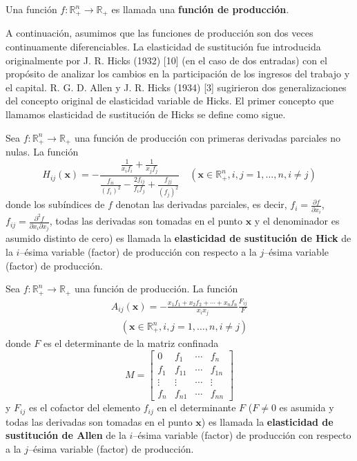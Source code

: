 \documentclass[a4paper,fleqn]{cas-dc}
\begin{document}
\begin{definition}
Una función $f\colon\mathds{R}^{n}_{+}\rightarrow\mathds{R}_{+}$ es llamada una \textbf{función de producción}.
\end{definition}
A continuación, asumimos que las funciones de producción son dos veces continuamente diferenciables. La elasticidad de sustitución fue introducida originalmente por J. R. Hicks (1932) [10] (en el caso de dos entradas) con el propósito de analizar los cambios en la participación de los ingresos del trabajo y el capital. R. G. D. Allen y J. R. Hicks (1934) [3] sugirieron dos generalizaciones del concepto original de elasticidad variable de Hicks. El primer concepto que llamamos elasticidad de sustitución de Hicks se define como sigue.
\begin{definition}
Sea $f\colon\mathds{R}^{n}_{+}\rightarrow\mathds{R}_{+}$ una función de producción con primeras derivadas parciales no nulas. La función
\begin{equation}
H_{ij}\left(\bm{x}\right)=-\frac{\frac{1}{x_{i}f_{i}}+\frac{1}{x_{j}f_{j}}}{\frac{f_{ii}}{{\left(f_{i}\right)}^{2}}-\frac{2f_{ij}}{f_{i}f_{j}}+\frac{f_{jj}}{{\left(f_{j}\right)}^{2}}}\quad\left(\bm{x}\in\mathds{R}^{n}_{+},i,j=1,\ldots,n,i\neq j\right)
\end{equation}
donde los subíndices de $f$ denotan las derivadas parciales, es decir, $f_{i}=\frac{\partial f}{\partial x_{i}}$, $f_{ij}=\frac{\partial^{2}f}{\partial x_{i}\partial x_{j}}$, todas las derivadas son tomadas en el punto $\bm{x}$ y el denominador es asumido distinto de cero) es llamada la \textbf{elasticidad de sustitución de Hick} de la $i$--ésima variable (factor) de producción con respecto a la $j$--ésima variable (factor) de producción.
\end{definition}
\begin{definition}
Sea $f\colon\mathds{R}^{n}_{+}\rightarrow\mathds{R}_{+}$ una función de producción. La función
\begin{multline}
A_{ij}\left(\bm{x}\right)=-\frac{x_{1}f_{1}+x_{2}f_{2}+\cdots+x_{n}f_{n}}{x_{i}x_{j}}\frac{F_{ij}}{F}\\
\quad\left(\bm{x}\in\mathds{R}^{n}_{+},i,j=1,\ldots,n,i\neq j\right)
\end{multline}
donde $F$ es el determinante de la matriz confinada
\begin{equation}
M=
\begin{bmatrix}
0 & f_{1} & \cdots & f_{n}\\
f_{1} & f_{11} & \cdots & f_{1n}\\
\vdots & \vdots & \cdots & \vdots\\
f_{n} & f_{n1} & \cdots & f_{nn}
\end{bmatrix}
\end{equation}
y $F_{ij}$ es el cofactor del elemento $f_{ij}$ en el determinante $F$ ($F\neq0$ es asumida y todas las derivadas son tomadas en el punto $\bm{x}$) es llamada la \textbf{elasticidad de sustitución de Allen} de la $i$--ésima variable (factor) de producción con respecto a la $j$--ésima variable (factor) de producción.
\end{definition}
\end{document}
